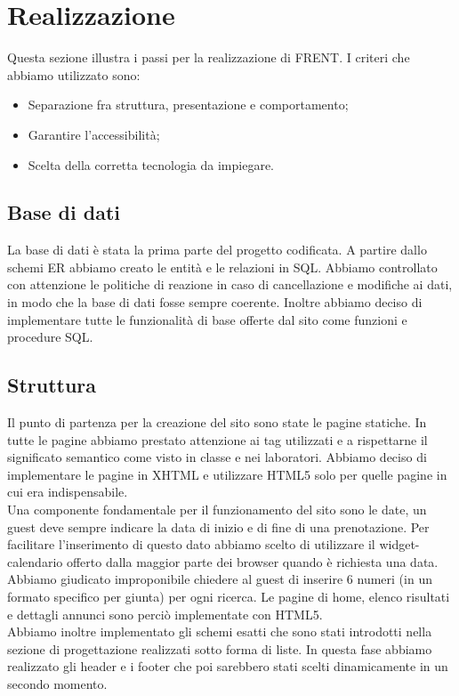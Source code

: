 \documentclass[1_relazione.tex]{subfiles}
\begin{document}
\section{Realizzazione}
Questa sezione illustra i passi per la realizzazione di FRENT.  I criteri che abbiamo utilizzato sono:
\begin{itemize}
\item Separazione fra struttura, presentazione e comportamento;
\item Garantire l'accessibilit\`{a};
\item Scelta della corretta tecnologia da impiegare.
\end{itemize}

\subsection{Base di dati}
La base di dati \`{e} stata la prima parte del progetto codificata. A partire dallo schemi ER abbiamo creato le entit\`{a} e le relazioni in SQL. Abbiamo controllato con attenzione le politiche di reazione in caso di cancellazione e modifiche ai dati, in modo che la base di dati fosse sempre coerente. Inoltre abbiamo deciso di implementare tutte le funzionalit\`{a} di base offerte dal sito come funzioni e procedure SQL.

\subsection{Struttura}
Il punto di partenza per la creazione del sito sono state le pagine statiche. In tutte le pagine abbiamo prestato attenzione ai tag utilizzati e a rispettarne il significato semantico come visto in classe e nei laboratori. Abbiamo deciso di implementare le pagine in XHTML e utilizzare HTML5 solo per quelle pagine in cui era indispensabile.\\ Una componente fondamentale per il funzionamento del sito sono le date, un guest deve sempre indicare la data di inizio e di fine di una prenotazione. Per facilitare l'inserimento di questo dato abbiamo scelto di utilizzare il widget-calendario offerto dalla maggior parte dei browser quando è richiesta una data. Abbiamo giudicato improponibile chiedere al guest di inserire 6 numeri (in un formato specifico per giunta) per ogni ricerca. Le pagine di home, elenco risultati e dettagli annunci sono perci\`{o} implementate con HTML5. \\
Abbiamo inoltre implementato gli schemi esatti che sono stati introdotti nella sezione di progettazione realizzati sotto forma di liste. In questa fase abbiamo realizzato gli header e i footer che poi sarebbero stati scelti dinamicamente in un secondo momento. \\
\end{document}
